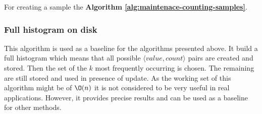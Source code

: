 For creating a sample the \textbf{Algorithm
  \ref{alg:maintenace-counting-samples}}.

\subsubsection{Full histogram on disk}
This algorithm is used as a baseline for the algorithms presented
above. It build a full histogram which means that all possible
$\langle value, count \rangle$ pairs are created and stored. Then the
set of the $k$ most frequently occurring is chosen. The remaining are
still stored and used in presence of update. As the working set of
this algorithm might be of $\O(n)$ it is not considered to be
very useful in real applications. However, it provides precise results
and can be used as a baseline for other methods.
